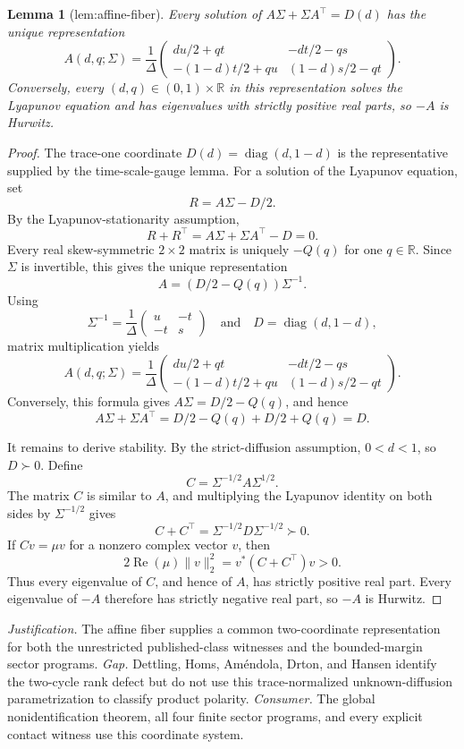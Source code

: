 \documentclass{article}
\newtheorem{lemma}{Lemma}
\begin{document}
\begin{lemma}[lem:affine-fiber]\label{lem:affine-fiber}
Every solution of \(A\Sigma+\Sigma A^{\top}=D(d)\) has the unique representation \[A(d,q;\Sigma)=\frac1\Delta\begin{pmatrix}du/2+qt&-dt/2-qs\\-(1-d)t/2+qu&(1-d)s/2-qt\end{pmatrix}.\] Conversely, every \((d,q)\in(0,1)\times\mathbb R\) in this representation solves the Lyapunov equation and has eigenvalues with strictly positive real parts, so \(-A\) is Hurwitz.
\end{lemma}
\begin{proof}
The trace-one coordinate \(D(d)=\operatorname{diag}(d,1-d)\) is the representative supplied by the time-scale-gauge lemma. For a solution of the Lyapunov equation, set
\[
R=A\Sigma-D/2.
\]
By the Lyapunov-stationarity assumption,
\[
R+R^{\top}=A\Sigma+\Sigma A^{\top}-D=0.
\]
Every real skew-symmetric \(2\times2\) matrix is uniquely \(-Q(q)\) for one \(q\in\mathbb R\). Since \(\Sigma\) is invertible, this gives the unique representation
\[
A=(D/2-Q(q))\Sigma^{-1}.
\]
Using
\[
\Sigma^{-1}=\frac1\Delta\begin{pmatrix}u&-t\\-t&s\end{pmatrix}
\quad\text{and}\quad
D=\operatorname{diag}(d,1-d),
\]
matrix multiplication yields
\[
A(d,q;\Sigma)=\frac1\Delta
\begin{pmatrix}
du/2+qt&-dt/2-qs\\
-(1-d)t/2+qu&(1-d)s/2-qt
\end{pmatrix}.
\]
Conversely, this formula gives \(A\Sigma=D/2-Q(q)\), and hence
\[
A\Sigma+\Sigma A^{\top}=D/2-Q(q)+D/2+Q(q)=D.
\]

It remains to derive stability. By the strict-diffusion assumption, \(0<d<1\), so \(D\succ0\). Define
\[
C=\Sigma^{-1/2}A\Sigma^{1/2}.
\]
The matrix \(C\) is similar to \(A\), and multiplying the Lyapunov identity on both sides by \(\Sigma^{-1/2}\) gives
\[
C+C^{\top}=\Sigma^{-1/2}D\Sigma^{-1/2}\succ0.
\]
If \(Cv=\mu v\) for a nonzero complex vector \(v\), then
\[
2\operatorname{Re}(\mu)\lVert v\rVert_2^2
=v^*(C+C^{\top})v>0.
\]
Thus every eigenvalue of \(C\), and hence of \(A\), has strictly positive real part. Every eigenvalue of \(-A\) therefore has strictly negative real part, so \(-A\) is Hurwitz.
\end{proof}
\par\smallskip\noindent \textit{Justification.} The affine fiber supplies a common two-coordinate representation for both the unrestricted published-class witnesses and the bounded-margin sector programs. \textit{Gap.} Dettling, Homs, Améndola, Drton, and Hansen identify the two-cycle rank defect but do not use this trace-normalized unknown-diffusion parametrization to classify product polarity. \textit{Consumer.} The global nonidentification theorem, all four finite sector programs, and every explicit contact witness use this coordinate system.
\end{document}
